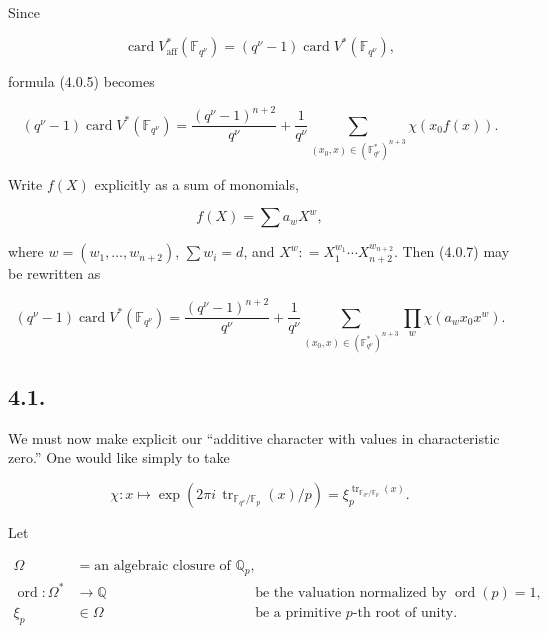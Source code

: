 Since

\begin{equation}\tag{4.0.6}
\operatorname{card}V^*_{\mathrm{aff}}(\mathbb F_{q^\nu})
=(q^\nu-1)\operatorname{card}V^*(\mathbb F_{q^\nu}),
\end{equation}

formula (4.0.5) becomes

\begin{equation}\tag{4.0.7}
(q^\nu-1)\operatorname{card}V^*(\mathbb F_{q^\nu})
=\frac{(q^\nu-1)^{n+2}}{q^\nu}
+\frac1{q^\nu}
\sum_{(x_0,x)\in(\mathbb F_{q^\nu}^*)^{n+3}}\chi(x_0f(x)).
\end{equation}

Write $f(X)$ explicitly as a sum of monomials,

\begin{equation}\tag{4.0.8}
f(X)=\sum a_wX^w,
\end{equation}

where $w=(w_1,\ldots,w_{n+2})$, $\sum w_i=d$, and
$X^w\mathrel{\mathop:}=X_1^{w_1}\cdots X_{n+2}^{w_{n+2}}$. Then (4.0.7)
may be rewritten as

\begin{equation}\tag{4.0.9}
(q^\nu-1)\operatorname{card}V^*(\mathbb F_{q^\nu})
=\frac{(q^\nu-1)^{n+2}}{q^\nu}
+\frac1{q^\nu}
\sum_{(x_0,x)\in(\mathbb F_{q^\nu}^*)^{n+3}}
\prod_w\chi(a_wx_0x^w).
\end{equation}

\subsection*{4.1.}
We must now make explicit our ``additive character with values in
characteristic zero.'' One would like simply to take

\begin{equation}\tag{4.1.0}
\chi:x\longmapsto
\exp\!\left(2\pi i\,\operatorname{tr}_{\mathbb F_{q^\nu}/\mathbb F_p}(x)/p\right)
=\xi_p^{\operatorname{tr}_{\mathbb F_{q^\nu}/\mathbb F_p}(x)}.
\end{equation}

Let

\begin{align}
\tag{4.1.1}
\Omega&=\text{an algebraic closure of }\mathbb Q_p,\\
\tag{4.1.2}
\operatorname{ord}:\Omega^*&\longrightarrow\mathbb Q
  &&\text{be the valuation normalized by }\operatorname{ord}(p)=1,\\
\tag{4.1.3}
\xi_p&\in\Omega
  &&\text{be a primitive $p$-th root of unity.}
\end{align}

